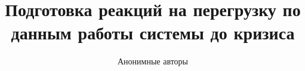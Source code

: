 \documentclass[runningheads]{llncs}
\begin{document}
\renewcommand{\keywordname}{{\bfseries Ключевые слова:}}

\title{Подготовка реакций на перегрузку по данным работы системы до кризиса}
\author{Анонимные авторы}
\maketitle





\FloatBarrier
\label{maintextend}


\end{document}
